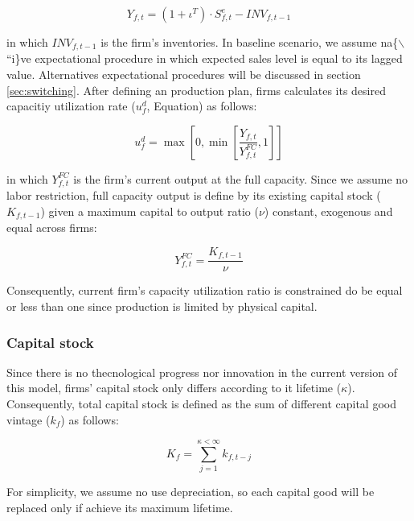 \documentclass{SelfArx}
\begin{document}
\begin{latex}
\begin{equation}
\label{Ch_super_EQ_Yf}
Y_{f,t} = (1+\iota^{T})\cdot S^{e}_{f,t} - INV_{f,t-1}
\end{equation}
\end{latex}
in which \(INV_{f,t-1}\) is the firm's inventories.
In baseline scenario, we assume na\{$\backslash$``i\}ve expectational procedure in which expected sales level is equal to its lagged value.
Alternatives expectational procedures will be discussed in section \ref{sec:switching}.
After defining an production plan, firms calculates its desired capacitiy utilization rate (\(u^{d}_{f}\), Equation) as follows:

\begin{latex}
\begin{equation}
u^{d}_{f} = \max\left[ 0, \min\left[ \frac{Y_{f,t}}{Y_{f,t}^{FC}}, 1 \right] \right]
\end{equation}
\end{latex}
in which \(Y_{f,t}^{FC}\) is the firm's current output at the full capacity.
Since we assume no labor restriction, full capacity output is define by its existing capital stock (\(K_{f,t-1}\)) given a maximum capital to output ratio (\(\nu\)) constant, exogenous and equal across firms:

\begin{latex}
\begin{equation}
Y_{f,t}^{FC} = \frac{K_{f,t-1}}{\nu}
\end{equation}
\end{latex}
Consequently, current firm's capacity utilization ratio is constrained do be equal or less than one since production is limited by physical capital.



\subsubsection{Capital stock}
\label{sec:org08233e2}


Since there is no thecnological progress nor innovation in the current version of this model, firms' capital stock only differs according to it lifetime (\(\kappa\)).
Consequently, total capital stock is defined as the sum of different capital good vintage (\(k_{f}\)) as follows:

\begin{latex}
\begin{equation}
K_{f} = \sum_{j=1}^{\kappa < \infty} k_{f,t-j}
\end{equation}
\end{latex}
For simplicity, we assume no use depreciation, so each capital good will be replaced only if achieve its maximum lifetime.
\end{document}
